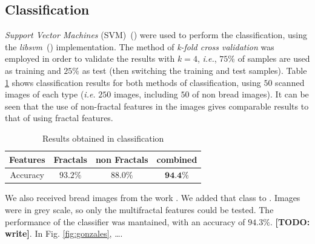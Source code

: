 \documentclass[oneside,a4paper,english,links]{amca}
\newcommand{\todo}[1]{\textbf{[TODO: #1]}}
\begin{document}
\subsection{Classification}
{\em Support Vector Machines} (SVM)~(\cite{Boser92}) were used to perform the classification, using the {\em libsvm}~(\cite{Chang2011}) implementation.
The method of {\em k-fold cross validation} was employed in order to validate the results with $k = 4$, {\em i.e.}, $75\%$ of samples are used as training and $25\%$ as test (then switching the training and test samples). Table \ref{table:tableFirstTest} shows classification results for both methods of classification, using $50$ scanned images of each type ({\em i.e.} $250$ images, including $50$ of non bread images). It can be seen that the use of non-fractal features in the images gives comparable results to that of using fractal features.

\begin{table}[htb]
\centering
\begin{tabular}{|c|c|c|c|}
    \hline
    Features & Fractals & non Fractals & combined\\
    \hline
    \hline
    Accuracy  & $93.2\%$ & $88.0\%$ & $\textbf{94.4\%}$\\
    \hline
\end{tabular}
\caption{Results obtained in classification}
\label{table:tableFirstTest}
\end{table}

We also received bread images from the work \cite{Gonzales2008}. We added that class to . Images were in grey scale, so only the multifractal features could be tested. The performance of the classifier was mantained, with an accuracy of $94.3\%$. \todo{write}. In Fig. \ref{fig:gonzales}, \dots.
\end{document}

